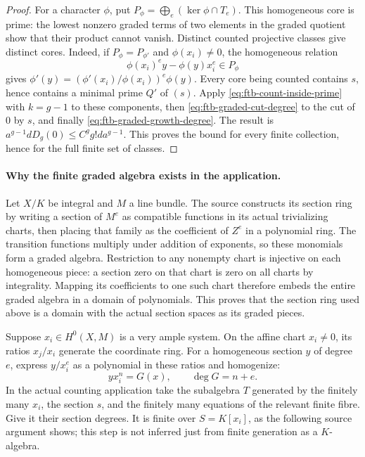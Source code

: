 \begin{proof}
For a character \(\phi\), put
\(P_\phi=\bigoplus_e(\ker\phi\cap T_e)\).
This homogeneous core is prime: the lowest nonzero graded
terms of two elements in the graded quotient show that
their product cannot vanish.
Distinct counted projective classes give distinct cores.
Indeed, if \(P_\phi=P_{\phi'}\) and \(\phi(x_i)\ne0\),
the homogeneous relation
\[
                    \phi(x_i)^e y-\phi(y)x_i^e\in P_\phi
\]
gives
\(\phi'(y)=(\phi'(x_i)/\phi(x_i))^e\phi(y)\).
Every core being counted contains \(s\), hence contains
a minimal prime \(Q'\) of \((s)\).
Apply \eqref{eq:ftb-count-inside-prime} with \(k=g-1\)
to these components, then \eqref{eq:ftb-graded-cut-degree}
to the cut of \(0\) by \(s\), and finally
\eqref{eq:ftb-graded-growth-degree}.
The result is
\(a^{g-1}dD_g(0)\le C^gg!d a^{g-1}\).
This proves the bound for every finite collection, hence
for the full finite set of classes.
\end{proof}

\paragraph{Why the finite graded algebra exists in the application.}
Let \(X/K\) be integral and \(M\) a line bundle.
The source constructs its section ring by writing a section of
\(M^e\) as compatible functions in its actual trivializing charts,
then placing that family as the coefficient of \(Z^e\)
in a polynomial ring.
The transition functions multiply under addition of exponents,
so these monomials form a graded algebra.
Restriction to any nonempty chart is injective on each
homogeneous piece: a section zero on that chart is zero on
all charts by integrality.
Mapping its coefficients to one such chart therefore embeds
the entire graded algebra in a domain of polynomials.
This proves that the section ring used above is a domain
with the actual section spaces as its graded pieces.

Suppose \(x_i\in H^0(X,M)\) is a very ample system.
On the affine chart \(x_i\ne0\), its ratios \(x_j/x_i\)
generate the coordinate ring.
For a homogeneous section \(y\) of degree \(e\), express
\(y/x_i^e\) as a polynomial in these ratios and homogenize:
\[
                          yx_i^n=G(x),\qquad\deg G=n+e.
 \tag{TZ10}\label{eq:ftb-section-ring-clearing}
\]
In the actual counting application take the subalgebra
\(T\) generated by the finitely many \(x_i\), the section
\(s\), and the finitely many equations of the relevant
finite fibre.
Give it their section degrees.
It is finite over \(S=K[x_i]\), as the following source
argument shows; this step is not inferred just from finite
generation as a \(K\)-algebra.

